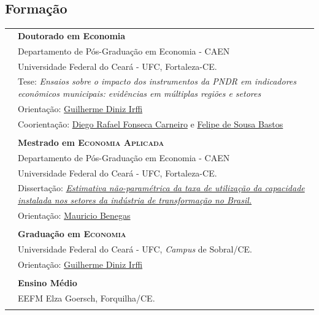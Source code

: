 \documentclass[a4paper,12pt]{article}
\begin{document}
	\subsection*{Formação}
	\setlength{\LTleft}{0pt}
	\begin{longtable}[t]{>{\raggedleft\arraybackslash}p{2.0cm}>{\raggedright\arraybackslash}p{13.5cm}}
		2025 & \textbf{Doutorado em Economia} \\
		& Departamento de Pós-Graduação em Economia - CAEN \\
		& Universidade Federal do Ceará - UFC, Fortaleza-CE. \\
		& Tese: \textit{Ensaios sobre o impacto dos instrumentos da PNDR em indicadores econômicos municipais: evidências em múltiplas regiões e setores} \\
		& Orientação: \href{http://lattes.cnpq.br/8821559850261716}{Guilherme Diniz Irffi} \\
		& Coorientação: \href{http://lattes.cnpq.br/4199618744331611}{Diego Rafael Fonseca Carneiro} e \href{http://lattes.cnpq.br/5346220628829577}{Felipe de Sousa Bastos} \\
		\multicolumn{2}{c}{\vspace{-0.2cm}} \\

		2016 & \textbf{Mestrado em \textsc{Economia Aplicada}} \\
		& Departamento de Pós-Graduação em Economia - CAEN \\
		& Universidade Federal do Ceará - UFC, Fortaleza-CE. \\
		& Dissertação: \href{http://repositorio.ufc.br/handle/riufc/29291}{\textit{Estimativa não-paramétrica da taxa de utilização da capacidade instalada nos setores da indústria de transformação no Brasil.}} \\
		& Orientação: \href{http://lattes.cnpq.br/6095762582986164}{Mauricio Benegas} \\
		\multicolumn{2}{c}{\vspace{-0.2cm}} \\

		2013 & \textbf{Graduação em \textsc{Economia}} \\
		& Universidade Federal do Ceará - UFC, \textit{Campus} de Sobral/CE. \\
		& Orientação: \href{http://lattes.cnpq.br/8821559850261716}{Guilherme Diniz Irffi} \\
		\multicolumn{2}{c}{\vspace{-0.2cm}} \\

		2006 & \textbf{Ensino Médio} \\
		& EEFM Elza Goersch, Forquilha/CE. \\
		\multicolumn{2}{c}{\vspace{-0.2cm}} \\
	\end{longtable}
\end{document}
